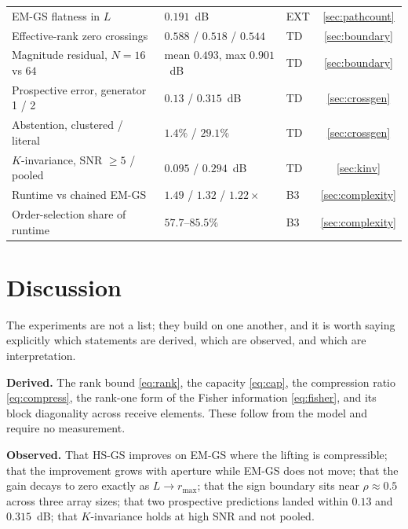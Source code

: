 \documentclass[journal]{IEEEtran}
\newcommand{\rmax}{r_{\max}}
\begin{document}
\begin{table}[!t]
\begin{tabular}{lllc}
EM-GS flatness in $L$ & $0.191$~dB & EXT & \ref{sec:pathcount} \\
Effective-rank zero crossings & $0.588$ / $0.518$ / $0.544$ & TD & \ref{sec:boundary} \\
Magnitude residual, $N=16$ vs $64$ & mean $0.493$, max $0.901$~dB & TD & \ref{sec:boundary} \\
Prospective error, generator 1 / 2 & $0.13$ / $\mathbf{0.315}$~dB & TD & \ref{sec:crossgen} \\
Abstention, clustered / literal & $1.4\%$ / $29.1\%$ & TD & \ref{sec:crossgen} \\
$K$-invariance, SNR $\ge5$ / pooled & $0.095$ / $0.294$~dB & TD & \ref{sec:kinv} \\
Runtime vs chained EM-GS & $1.49$ / $1.32$ / $1.22\times$ & B3 & \ref{sec:complexity} \\
Order-selection share of runtime & $57.7$--$85.5\%$ & B3 & \ref{sec:complexity} \\
\bottomrule
\end{tabular}
\end{table}

\section{Discussion}\label{sec:discussion}

The experiments are not a list; they build on one another, and it is worth
saying explicitly which statements are derived, which are observed, and which
are interpretation.

\textbf{Derived.} The rank bound \eqref{eq:rank}, the capacity \eqref{eq:cap},
the compression ratio \eqref{eq:compress}, the rank-one form of the Fisher
information \eqref{eq:fisher}, and its block diagonality across receive
elements. These follow from the model and require no measurement.

\textbf{Observed.} That HS-GS improves on EM-GS where the lifting is
compressible; that the improvement grows with aperture while EM-GS does not
move; that the gain decays to zero exactly as $L\to\rmax$; that the sign
boundary sits near $\rho\approx0.5$ across three array sizes; that two
prospective predictions landed within $0.13$ and $0.315$~dB; that $K$-invariance
holds at high SNR and not pooled.
\end{document}
